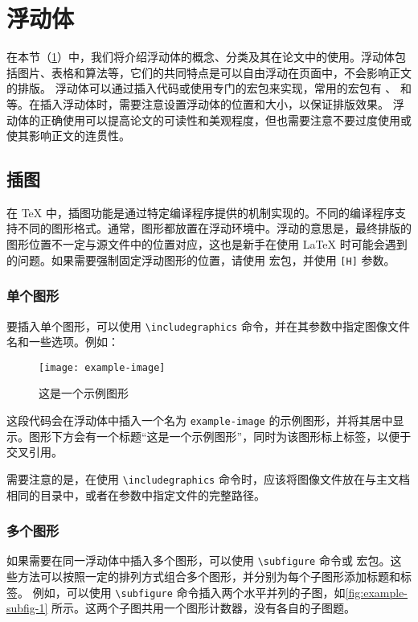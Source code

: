 \section{浮动体}\label{sec:float}

在本节（\ref{sec:float}）中，我们将介绍浮动体的概念、分类及其在论文中的使用。浮动体包括图片、表格和算法等，它们的共同特点是可以自由浮动在页面中，不会影响正文的排版。
浮动体可以通过插入代码或使用专门的宏包来实现，常用的宏包有 、 和  等。在插入浮动体时，需要注意设置浮动体的位置和大小，以保证排版效果。
浮动体的正确使用可以提高论文的可读性和美观程度，但也需要注意不要过度使用或使其影响正文的连贯性。

\subsection{插图}

在 \TeX{} 中，插图功能是通过特定编译程序提供的机制实现的。不同的编译程序支持不同的图形格式。通常，图形都放置在浮动环境中。浮动的意思是，最终排版的图形位置不一定与源文件中的位置对应，这也是新手在使用 \LaTeX{} 时可能会遇到的问题。如果需要强制固定浮动图形的位置，请使用  宏包，并使用 \texttt{[H]} 参数。

\subsubsection{单个图形}

要插入单个图形，可以使用 \verb|\includegraphics| 命令，并在其参数中指定图像文件名和一些选项。例如：

\begin{figure}[!htb]
  \centering
  \texttt{[image: example-image]}
  \caption{这是一个示例图形}
  \label{fig:example}
\end{figure}

这段代码会在浮动体中插入一个名为 \verb|example-image| 的示例图形，并将其居中显示。图形下方会有一个标题“这是一个示例图形”，同时为该图形标上标签，以便于交叉引用。

需要注意的是，在使用 \verb|\includegraphics| 命令时，应该将图像文件放在与主文档相同的目录中，或者在参数中指定文件的完整路径。

\subsubsection{多个图形}

如果需要在同一浮动体中插入多个图形，可以使用 \verb|\subfigure| 命令或  宏包。这些方法可以按照一定的排列方式组合多个图形，并分别为每个子图形添加标题和标签。
例如，可以使用 \verb|\subfigure| 命令插入两个水平并列的子图，如\ref{fig:example-subfig-1} 所示。这两个子图共用一个图形计数器，没有各自的子图题。

